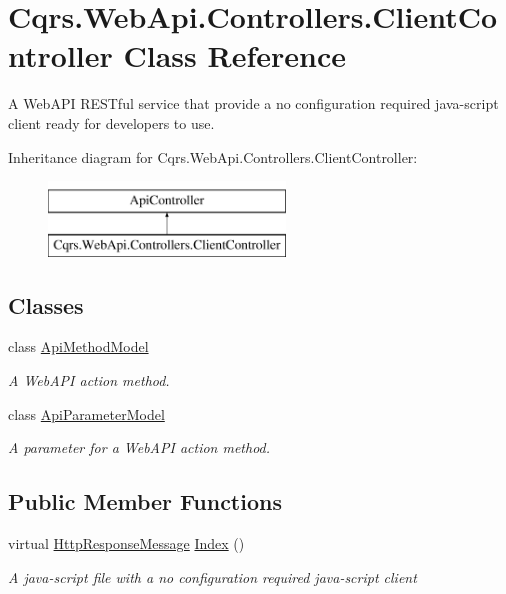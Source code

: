 \hypertarget{classCqrs_1_1WebApi_1_1Controllers_1_1ClientController}{}\section{Cqrs.\+Web\+Api.\+Controllers.\+Client\+Controller Class Reference}
\label{classCqrs_1_1WebApi_1_1Controllers_1_1ClientController}


A Web\+A\+PI R\+E\+S\+Tful service that provide a \textquotesingle{}no configuration required\textquotesingle{} java-\/script client ready for developers to use.  


Inheritance diagram for Cqrs.\+Web\+Api.\+Controllers.\+Client\+Controller\+:\begin{figure}[H]
\begin{center}
\leavevmode
\includegraphics[height=2.000000cm]{classCqrs_1_1WebApi_1_1Controllers_1_1ClientController}
\end{center}
\end{figure}
\subsection*{Classes}
\begin{DoxyCompactItemize}
\item 
class \hyperlink{classCqrs_1_1WebApi_1_1Controllers_1_1ClientController_1_1ApiMethodModel}{Api\+Method\+Model}
\begin{DoxyCompactList}\small\item\em A Web\+A\+PI action method. \end{DoxyCompactList}\item 
class \hyperlink{classCqrs_1_1WebApi_1_1Controllers_1_1ClientController_1_1ApiParameterModel}{Api\+Parameter\+Model}
\begin{DoxyCompactList}\small\item\em A parameter for a Web\+A\+PI action method. \end{DoxyCompactList}\end{DoxyCompactItemize}
\subsection*{Public Member Functions}
\begin{DoxyCompactItemize}
\item 
virtual \hyperlink{classCqrs_1_1WebApi_1_1HttpResponseMessage}{Http\+Response\+Message} \hyperlink{classCqrs_1_1WebApi_1_1Controllers_1_1ClientController_abcd1d9049d9e3cee06558ccf055639f3_abcd1d9049d9e3cee06558ccf055639f3}{Index} ()
\begin{DoxyCompactList}\small\item\em A java-\/script file with a \textquotesingle{}no configuration required\textquotesingle{} java-\/script client \end{DoxyCompactList}\end{DoxyCompactItemize}


